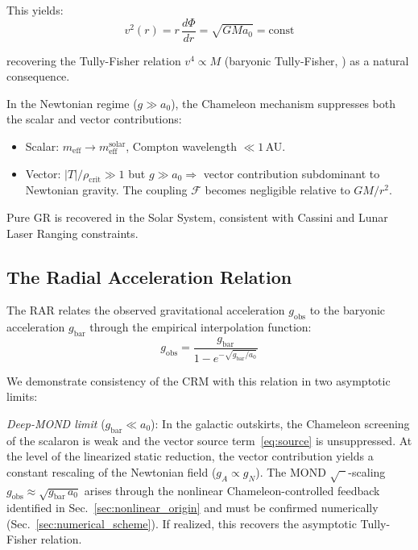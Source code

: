 \documentclass[aps,prd,twocolumn,superscriptaddress,nofootinbib]{revtex4-2}
\begin{document}
This yields:
\begin{equation}
v^2(r) = r\,\frac{d\Phi}{dr} = \sqrt{G M a_0} = \mathrm{const}
\end{equation}

recovering the Tully-Fisher relation $v^4 \propto M$ (baryonic Tully-Fisher, \cite{McGaugh2012}) as a natural consequence.

In the Newtonian regime ($g \gg a_0$), the Chameleon mechanism suppresses both the scalar and vector contributions:
\begin{itemize}
\item Scalar: $m_{\mathrm{eff}} \to m_{\mathrm{eff}}^{\mathrm{solar}}$, Compton wavelength $\ll 1$\,AU.
\item Vector: $|T|/\rho_{\mathrm{crit}} \gg 1$ but $g \gg a_0 \Rightarrow$ vector contribution subdominant to Newtonian gravity. The coupling $\mathcal{F}$ becomes negligible relative to $GM/r^2$.
\end{itemize}

Pure GR is recovered in the Solar System, consistent with Cassini \cite{Bertotti2003} and Lunar Laser Ranging constraints.

\subsection{The Radial Acceleration Relation}
\label{sec:rar}

The RAR \cite{McGaugh2016} relates the observed gravitational acceleration $g_{\mathrm{obs}}$ to the baryonic acceleration $g_{\mathrm{bar}}$ through the empirical interpolation function:
\begin{equation}
g_{\mathrm{obs}} = \frac{g_{\mathrm{bar}}}{1 - e^{-\sqrt{g_{\mathrm{bar}}/a_0}}}
\label{eq:rar}
\end{equation}

We demonstrate consistency of the CRM with this relation in two asymptotic limits:

\textit{Deep-MOND limit} ($g_{\mathrm{bar}} \ll a_0$): In the galactic outskirts, the Chameleon screening of the scalaron is weak and the vector source term~\eqref{eq:source} is unsuppressed. At the level of the linearized static reduction, the vector contribution yields a constant rescaling of the Newtonian field ($g_A \propto g_N$). The MOND $\sqrt{\phantom{x}}$-scaling $g_{\mathrm{obs}} \approx \sqrt{g_{\mathrm{bar}}\,a_0}$ arises through the nonlinear Chameleon-controlled feedback identified in Sec.~\ref{sec:nonlinear_origin} and must be confirmed numerically (Sec.~\ref{sec:numerical_scheme}). If realized, this recovers the asymptotic Tully-Fisher relation.
\end{document}
